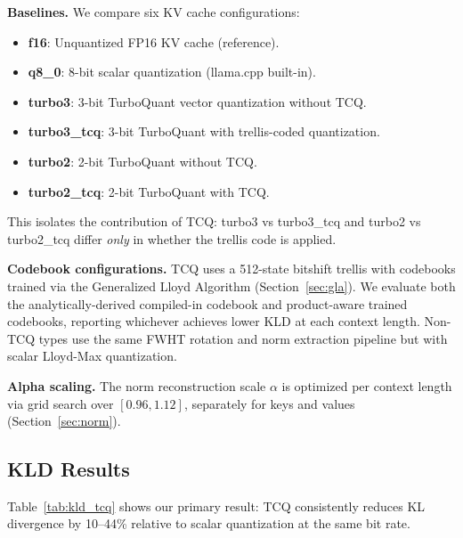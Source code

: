\documentclass{article}
\begin{document}
\textbf{Baselines.} We compare six KV cache configurations:
\begin{itemize}\setlength{\itemsep}{0pt}\setlength{\parskip}{0pt}
  \item \textbf{f16}: Unquantized FP16 KV cache (reference).
  \item \textbf{q8\_0}: 8-bit scalar quantization (llama.cpp built-in).
  \item \textbf{turbo3}: 3-bit TurboQuant vector quantization without TCQ.
  \item \textbf{turbo3\_tcq}: 3-bit TurboQuant with trellis-coded quantization.
  \item \textbf{turbo2}: 2-bit TurboQuant without TCQ.
  \item \textbf{turbo2\_tcq}: 2-bit TurboQuant with TCQ.
\end{itemize}
This isolates the contribution of TCQ: turbo3 vs turbo3\_tcq and turbo2 vs
turbo2\_tcq differ \emph{only} in whether the trellis code is applied.

\textbf{Codebook configurations.} TCQ uses a 512-state bitshift trellis with
codebooks trained via the Generalized Lloyd Algorithm
(Section~\ref{sec:gla}). We evaluate both the analytically-derived
compiled-in codebook and product-aware trained codebooks, reporting whichever
achieves lower KLD at each context length. Non-TCQ types use the same FWHT
rotation and norm extraction pipeline but with scalar Lloyd-Max quantization.

\textbf{Alpha scaling.} The norm reconstruction scale $\alpha$ is optimized
per context length via grid search over $[0.96, 1.12]$, separately for keys
and values (Section~\ref{sec:norm}).

\subsection{KLD Results}
\label{sec:kld_results}

Table~\ref{tab:kld_tcq} shows our primary result: TCQ consistently reduces KL
divergence by 10--44\% relative to scalar quantization at the same bit rate.
\end{document}
